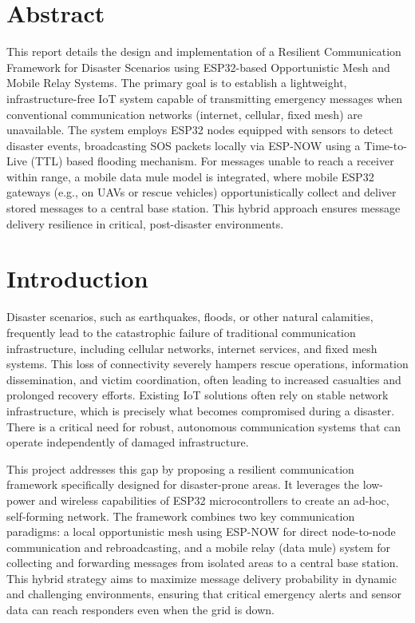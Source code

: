 \documentclass[12pt, a4paper]{article}
\begin{document}
\clearpage
\tableofcontents
\clearpage

\section{Abstract} 
This report details the design and implementation of a Resilient Communication Framework for Disaster Scenarios using ESP32-based Opportunistic Mesh and Mobile Relay Systems. The primary goal is to establish a lightweight, infrastructure-free IoT system capable of transmitting emergency messages when conventional communication networks (internet, cellular, fixed mesh) are unavailable. The system employs ESP32 nodes equipped with sensors to detect disaster events, broadcasting SOS packets locally via ESP-NOW using a Time-to-Live (TTL) based flooding mechanism. For messages unable to reach a receiver within range, a mobile data mule model is integrated, where mobile ESP32 gateways (e.g., on UAVs or rescue vehicles) opportunistically collect and deliver stored messages to a central base station. This hybrid approach ensures message delivery resilience in critical, post-disaster environments.

\section{Introduction} 
Disaster scenarios, such as earthquakes, floods, or other natural calamities, frequently lead to the catastrophic failure of traditional communication infrastructure, including cellular networks, internet services, and fixed mesh systems. This loss of connectivity severely hampers rescue operations, information dissemination, and victim coordination, often leading to increased casualties and prolonged recovery efforts. Existing IoT solutions often rely on stable network infrastructure, which is precisely what becomes compromised during a disaster. There is a critical need for robust, autonomous communication systems that can operate independently of damaged infrastructure.

This project addresses this gap by proposing a resilient communication framework specifically designed for disaster-prone areas. It leverages the low-power and wireless capabilities of ESP32 microcontrollers to create an ad-hoc, self-forming network. The framework combines two key communication paradigms: a local opportunistic mesh using ESP-NOW for direct node-to-node communication and rebroadcasting, and a mobile relay (data mule) system for collecting and forwarding messages from isolated areas to a central base station. This hybrid strategy aims to maximize message delivery probability in dynamic and challenging environments, ensuring that critical emergency alerts and sensor data can reach responders even when the grid is down.
\end{document}
